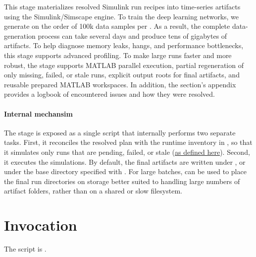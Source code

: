 \documentclass[11pt]{article}
\begin{document}
\label{docstart:simulation_stage}
This stage materializes resolved Simulink run recipes into time-series artifacts using the Simulink/Simscape engine.
To train the deep learning networks, we generate on the order of 100k data samples per \termSimulator.
As a result, the complete data-generation process can take several days and produce tens of gigabytes of artifacts.
To help diagnose memory leaks, hangs, and performance bottlenecks, this stage supports advanced profiling.
To make large runs faster and more robust, the stage supports MATLAB parallel execution, partial regeneration of only missing, failed, or stale runs, explicit output roots for final artifacts, and reusable prepared MATLAB workspaces.
In addition, the section's appendix provides a logbook of encountered issues and how they were resolved.

\paragraph{Internal mechansim}
The stage is exposed as a single script that internally performs two separate tasks.
First, it reconciles the resolved plan with the runtime inventory in , so that it simulates only runs that are pending, failed, or stale (\hyperref[sec:simulate-stale-run-definition]{as defined here}).
Second, it executes the simulations.
By default, the final artifacts are written under , or under the base directory specified with .
For large batches,  can be used to place the final run directories on storage better suited to handling large numbers of artifact folders, rather than on a shared or slow filesystem.

\section*{Invocation}
The script is .
\end{document}
